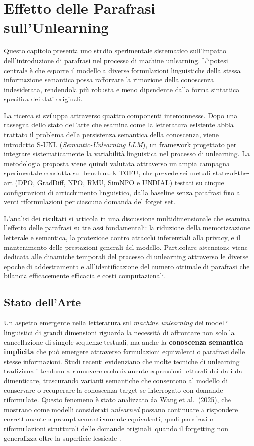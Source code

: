 \chapter{Effetto delle Parafrasi sull'Unlearning}

Questo capitolo presenta uno studio sperimentale sistematico sull'impatto dell'introduzione di parafrasi nel processo di machine unlearning. L'ipotesi centrale è che esporre il modello a diverse formulazioni linguistiche della stessa informazione semantica possa rafforzare la rimozione della conoscenza indesiderata, rendendola più robusta e meno dipendente dalla forma sintattica specifica dei dati originali.

La ricerca si sviluppa attraverso quattro componenti interconnesse. Dopo una rassegna dello stato dell'arte che esamina come la letteratura esistente abbia trattato il problema della persistenza semantica della conoscenza, viene introdotto S-UNL (\textit{Semantic-Unlearning LLM}), un framework progettato per integrare sistematicamente la variabilità linguistica nel processo di unlearning. La metodologia proposta viene quindi valutata attraverso un'ampia campagna sperimentale condotta sul benchmark TOFU, che prevede sei metodi state-of-the-art (DPO, GradDiff, NPO, RMU, SimNPO e UNDIAL) testati su cinque configurazioni di arricchimento linguistico, dalla baseline senza parafrasi fino a venti riformulazioni per ciascuna domanda del forget set.

L'analisi dei risultati si articola in una discussione multidimensionale che esamina l'effetto delle parafrasi su tre assi fondamentali: la riduzione della memorizzazione letterale e semantica, la protezione contro attacchi inferenziali alla privacy, e il mantenimento delle prestazioni generali del modello. Particolare attenzione viene dedicata alle dinamiche temporali del processo di unlearning attraverso le diverse epoche di addestramento e all'identificazione del numero ottimale di parafrasi che bilancia efficacemente efficacia e costi computazionali.

\section{Stato dell’Arte}

Un aspetto emergente nella letteratura sul \emph{machine unlearning} dei modelli linguistici di grandi dimensioni riguarda la necessità di affrontare non solo la cancellazione di singole sequenze testuali, ma anche la \textbf{conoscenza semantica implicita} che può emergere attraverso formulazioni equivalenti o parafrasi delle stesse informazioni. Studi recenti evidenziano che molte tecniche di unlearning tradizionali tendono a rimuovere esclusivamente espressioni letterali dei dati da dimenticare, trascurando varianti semantiche che consentono al modello di conservare o recuperare la conoscenza target se interrogato con domande riformulate. Questo fenomeno è stato analizzato da Wang et al.\ (2025), che mostrano come modelli considerati \textit{unlearned} possano continuare a rispondere correttamente a prompt semanticamente equivalenti, quali parafrasi o riformulazioni strutturali delle domande originali, quando il forgetting non generalizza oltre la superficie lessicale \cite{wang_erasing_2025}.


